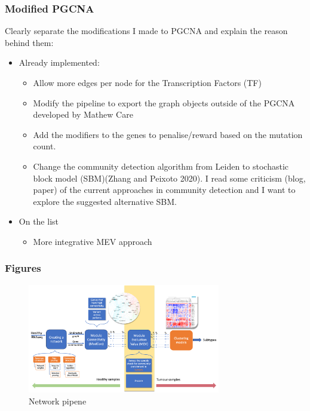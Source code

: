 \subsubsection{Modified PGCNA}

Clearly separate the modifications I made to PGCNA and explain the reason behind them:

\begin{itemize}
    \item Already implemented:
          \begin{itemize}
              \item Allow more edges per node for the Transcription Factors (TF)
              \item Modify the pipeline to export the graph objects outside of the PGCNA developed by Mathew Care
              \item Add the modifiers to the genes to penalise/reward based on the mutation count.
              \item Change the community detection algorithm from Leiden to stochastic block model (SBM)(Zhang and Peixoto 2020). I read some criticism (blog, paper) of the current approaches in community detection and I want to explore the suggested alternative SBM.
          \end{itemize}
    \item On the list
    \begin{itemize}
        \item More integrative MEV approach
    \end{itemize}
\end{itemize}

\subsubsection{Figures} 


\begin{figure}[!htb]
    \centering\includegraphics[width=0.75\textwidth,height=0.75\textheight,keepaspectratio]{Sections/Network_I/Resources/Methods/network_pipeline.png}
    \caption{Network pipene}
    \label{fig:N_I:network_pipeline}
\end{figure}



